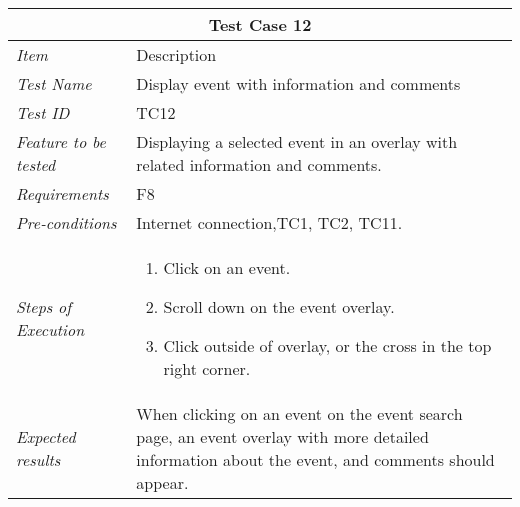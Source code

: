 %
\begin{minipage}{\linewidth}
\setlength{\tabcolsep}{15pt}
\centering
{}
\begin{tabular}{ |l|p{70mm}| }
	\hline
	\multicolumn{2}{|c|}{\cellcolor{gray!25} \textbf{Test Case 12}} \\
	\hline
	\it{\cellcolor{gray!25}Item} & {\cellcolor{gray!25} Description } \\
	\hline
	\it{\cellcolor{gray!25}Test Name } & Display event with information and comments \\ \hline
	\it{\cellcolor{gray!25}Test ID} & TC12 \\ \hline
	\it{\cellcolor{gray!25}Feature to be tested} & Displaying a selected event in an overlay with related information and comments. \\ \hline
	\it{\cellcolor{gray!25}Requirements} & F8  \\ \hline
	\it{\cellcolor{gray!25}Pre-conditions} & Internet connection,TC1, TC2, TC11. \\ \hline
	\it{\cellcolor{gray!25}Steps of Execution} & \begin{enumerate}
	                                       \item Click on an event.
	                                       \item Scroll down on the event overlay.
	                                       \item Click outside of overlay, or the cross in the top right corner.
	                                     \end{enumerate} \\ \hline
	\it{\cellcolor{gray!25}Expected results} & When clicking on an event  on the event search page, an event overlay with more detailed information about the event, and comments should appear.  \\
	\hline
\end{tabular}
\medskip
\end{minipage}
%
